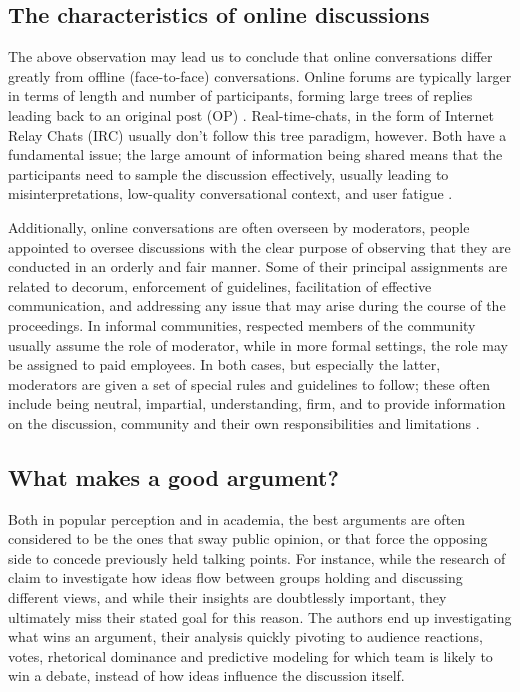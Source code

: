 \subsection{The characteristics of online discussions}
\label{sec:background:arguments-online}

The above observation may lead us to conclude that online conversations differ greatly from offline (face-to-face) conversations. Online forums are typically larger in terms of length and number of participants, forming large trees of replies leading back to an original post (OP) \cite{boschi2021wordunderstandingsampleonline}. Real-time-chats, in the form of Internet Relay Chats (IRC) usually don't follow this tree paradigm, however. Both have a fundamental issue; the large amount of information being shared means that the participants need to sample the discussion effectively, usually leading to misinterpretations, low-quality conversational context, and user fatigue \cite{boschi2021wordunderstandingsampleonline}. 

Additionally, online conversations are often overseen by moderators, people appointed to oversee discussions with the clear purpose of observing that they are conducted in an orderly and fair manner. Some of their principal assignments are related to decorum, enforcement of guidelines, facilitation of effective communication, and addressing any issue that may arise during the course of the proceedings. In informal communities, respected members of the community usually assume the role of moderator, while in more formal settings, the role may be assigned to paid employees. In both cases, but especially the latter, moderators are given a set of special rules and guidelines to follow; these often include being neutral, impartial, understanding, firm, and to provide information on the discussion, community and their own responsibilities and limitations \cite{Cornell_eRulemaking2017}.

\subsection{What makes a good argument?}
\label{sec:background:good-argument}

Both in popular perception and in academia, the best arguments are often considered to be the ones that sway public opinion, or that force the opposing side to concede previously held talking points. For instance, while the research of \cite{zhang2016-oxford} claim to investigate how ideas flow between groups holding and discussing different views, and while their insights are doubtlessly important, they ultimately miss their stated goal for this reason. The authors end up investigating what wins an argument, their analysis quickly pivoting to audience reactions, votes, rhetorical dominance and predictive modeling for which team is likely to win a debate, instead of how ideas influence the discussion itself.

